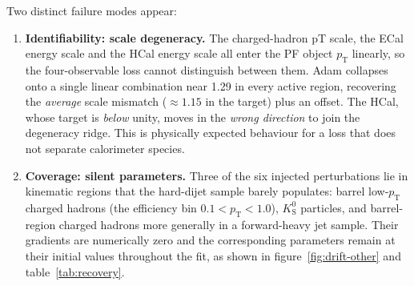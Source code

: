 \documentclass[a4paper,11pt]{article}
\begin{document}
Two distinct failure modes appear:
\begin{enumerate}
 \item \textbf{Identifiability: scale degeneracy.} The charged-hadron
 pT scale, the ECal energy scale and the HCal energy scale all enter
 the PF object $p_\mathrm{T}$ linearly, so the four-observable loss
 cannot distinguish between them. Adam collapses onto a single linear
 combination near 1.29 in every active region, recovering the
 \emph{average} scale mismatch ($\approx1.15$ in the target) plus an
 offset. The HCal, whose target is \emph{below} unity, moves in the
 \emph{wrong direction} to join the degeneracy ridge. This is
 physically expected behaviour for a loss that does not separate
 calorimeter species.
 \item \textbf{Coverage: silent parameters.} Three of the six injected
 perturbations lie in kinematic regions that the hard-dijet sample
 barely populates: barrel low-$p_\mathrm{T}$ charged hadrons (the
 efficiency bin $0.1<p_\mathrm{T}<1.0$), $K^{0}_{\mathrm{S}}$ particles,
 and barrel-region charged hadrons more generally in a forward-heavy
 jet sample. Their gradients are numerically zero and the
 corresponding parameters remain at their initial values throughout
 the fit, as shown in figure~\ref{fig:drift-other} and
 table~\ref{tab:recovery}.
\end{enumerate}
\end{document}
